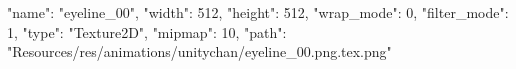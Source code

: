 {
  "name": "eyeline_00",
  "width": 512,
  "height": 512,
  "wrap_mode": 0,
  "filter_mode": 1,
  "type": "Texture2D",
  "mipmap": 10,
  "path": "Resources/res/animations/unitychan/eyeline_00.png.tex.png"
}